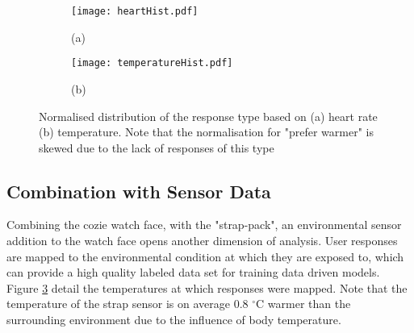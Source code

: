 \begin{figure}
    \begin{subfigure}[t]{0.49\textwidth}  
    \centering
	\texttt{[image: heartHist.pdf]}
	\caption{(a)}
	\label{fig:heartHist}
    \end{subfigure}
    \begin{subfigure}[t]{0.49\textwidth}
    \centering
		\texttt{[image: temperatureHist.pdf]}
		\caption{(b)}
		\label{fig:tempHist}	
    \end{subfigure}
    \caption{ Normalised distribution of the response type based on (a) heart rate (b) temperature. Note that the normalisation for "prefer warmer" is skewed due to the lack of responses of this type}
\end{figure}



\subsection{Combination with Sensor Data}

Combining the cozie watch face, with the "strap-pack", an environmental sensor addition to the watch face opens another dimension of analysis. User responses are mapped to the environmental condition at which they are exposed to, which can provide a high quality labeled data set for training data driven models. Figure \ref{fig:tempHist} detail the temperatures at which responses were mapped. Note that the temperature of the strap sensor is on average 0.8 $^\circ$C warmer than the surrounding environment due to the influence of body temperature. 


